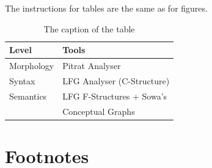 \documentclass[10pt, a4paper]{article}
\begin{document}
The instructions for tables are the same as for figures.
%
\begin{table}[!h]
\begin{center}
\begin{tabularx}{\columnwidth}{|l|X|}

      \hline
      Level&Tools\\
      \hline
      Morphology & Pitrat Analyser\\
      \hline
      Syntax & LFG Analyser (C-Structure)\\
      \hline
     Semantics & LFG F-Structures + Sowa's\\
     & Conceptual Graphs\\
      \hline

\end{tabularx}
\caption{The caption of the table}
 \end{center}
\end{table}

%
%
%
%
%

\section{Footnotes}
\end{document}
